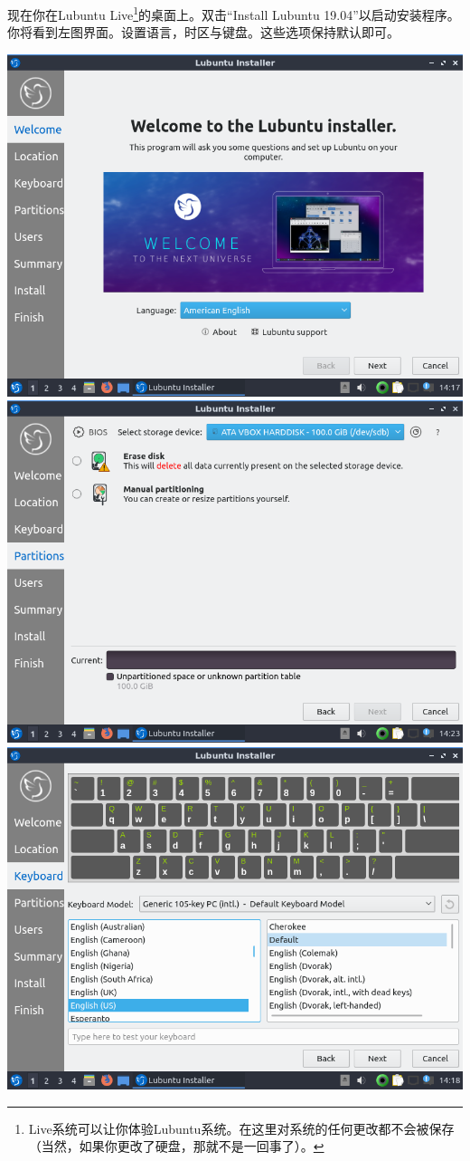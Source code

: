 \documentclass{book}
\begin{document}
现在你在Lubuntu Live\footnote{Live系统可以让你体验Lubuntu系统。在这里对系统的任何更改都不会被保存（当然，如果你更改了硬盘，那就不是一回事了）。}的桌面上。双击“Install Lubuntu 19.04”以启动安装程序。你将看到左图界面。设置语言，时区与键盘。这些选项保持默认即可。
\begin{center}
	\includegraphics[scale=0.4]{pic/lubinst3}	\includegraphics[scale=0.4]{pic/lubinst7}\\
	\includegraphics[scale=0.4]{pic/lubinst5}
\end{center}
\end{document}

